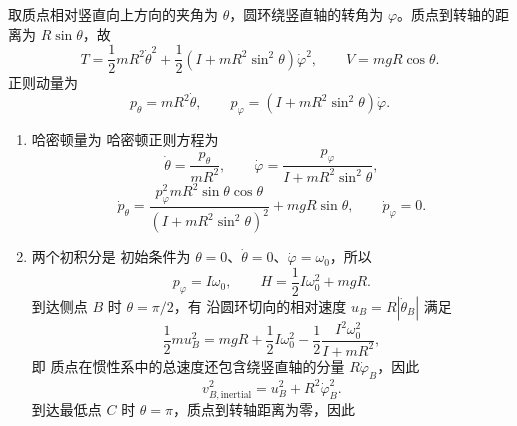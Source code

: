 \begin{question}[转动圆环上的滑块]
\begin{solution}
取质点相对竖直向上方向的夹角为 $\theta$，圆环绕竖直轴的转角为 $\varphi$。质点到转轴的距离为 $R\sin\theta$，故
\[
  T=\frac12mR^2\dot\theta^2
  +\frac12\left(I+mR^2\sin^2\theta\right)\dot\varphi^2,
  \qquad
  V=mgR\cos\theta .
\]
正则动量为
\[
  p_\theta=mR^2\dot\theta,
  \qquad
  p_\varphi=\left(I+mR^2\sin^2\theta\right)\dot\varphi .
\]
\begin{enumerate}
  \item 哈密顿量为
  哈密顿正则方程为
  \[
    \dot\theta=\frac{p_\theta}{mR^2},
    \qquad
    \dot\varphi=\frac{p_\varphi}{I+mR^2\sin^2\theta},
  \]
  \[
    \dot p_\theta=\frac{p_\varphi^2mR^2\sin\theta\cos\theta}
    {(I+mR^2\sin^2\theta)^2}+mgR\sin\theta,
    \qquad
    \dot p_\varphi=0 .
  \]
  \item 两个初积分是
  初始条件为 $\theta=0$、$\dot\theta=0$、$\dot\varphi=\omega_0$，所以
  \[
    p_\varphi=I\omega_0,
    \qquad
    H=\frac12I\omega_0^2+mgR .
  \]
  到达侧点 $B$ 时 $\theta=\pi/2$，有
  沿圆环切向的相对速度 $u_B=R|\dot\theta_B|$ 满足
  \[
    \frac12m u_B^2
    =mgR+\frac12I\omega_0^2-\frac12\frac{I^2\omega_0^2}{I+mR^2},
  \]
  即
  质点在惯性系中的总速度还包含绕竖直轴的分量 $R\dot\varphi_B$，因此
  \[
    v_{B,\mathrm{inertial}}^2
    =u_B^2+R^2\dot\varphi_B^2 .
  \]
  到达最低点 $C$ 时 $\theta=\pi$，质点到转轴距离为零，因此
\end{enumerate}
\end{solution}

\end{question}

